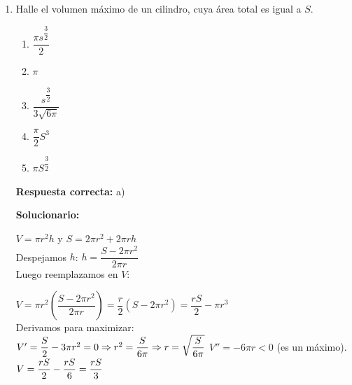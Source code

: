 \begin{enumerate}[resume]
	$ x + 1 = A_1(x-1)^2 + A_2(x-1) + A_3 $
	
	$ x + 1 = A_1(x^2 - 2x + 1) + A_2x - A_2 + A_3 $
	
	Comparando coeficientes:
	\begin{itemize}
		\item Para $x^2$: $A_1 = 0$
		\item Para $x$: $A_2 - 2A_1 = 1 \Rightarrow A_2 - 0 = 1 \Rightarrow A_2 = 1$
		\item Término independiente: $A_1 - A_2 + A_3 = 1 \Rightarrow 0 - 1 + A_3 = 1 \Rightarrow A_3 = 2$
	\end{itemize}
	Por lo tanto, .
	
	
	
	
	\item Halle el volumen máximo de un cilindro, cuya área total es igual a $S$.
	
	\begin{enumerate}[label=\alph*)]
		\item $\displaystyle\dfrac{\pi s^{\dfrac{3}{2}}}{2}$
		\item $\pi$
		\item $\displaystyle\dfrac{s^{\dfrac{3}{2}}}{3\sqrt{6\pi}}$
		\item $\displaystyle\dfrac{\pi}{2} S^3$
		\item $\pi S^{\dfrac{3}{2}}$
	\end{enumerate}
	
	\textbf{Respuesta correcta:} a)
	
	\vspace{2mm}
	\textbf{Solucionario:}
	
	$V = \pi r^2 h$ y $S = 2\pi r^2 + 2\pi r h$ \\
	
	Despejamos $h$: $h = \dfrac{S - 2\pi r^2}{2\pi r}$ \\
	
	Luego reemplazamos en $V$:
	
	$V = \pi r^2 \left( \dfrac{S - 2\pi r^2}{2\pi r} \right) = \dfrac{r}{2}(S - 2\pi r^2) = \dfrac{rS}{2} - \pi r^3 $\\
	
	Derivamos para maximizar:\\
	$V' = \dfrac{S}{2} - 3\pi r^2 = 0 \Rightarrow r^2 = \dfrac{S}{6\pi} \Rightarrow r = \sqrt{\dfrac{S}{6\pi}}\\ $
	 $V'' = -6\pi r < 0$ (es un máximo). \\
	 $V = \dfrac{rS}{2} - \dfrac{rS}{6} = \dfrac{rS}{3}\\$ 
	 \\
	
	
	\vspace{6mm}
	
\end{enumerate}


